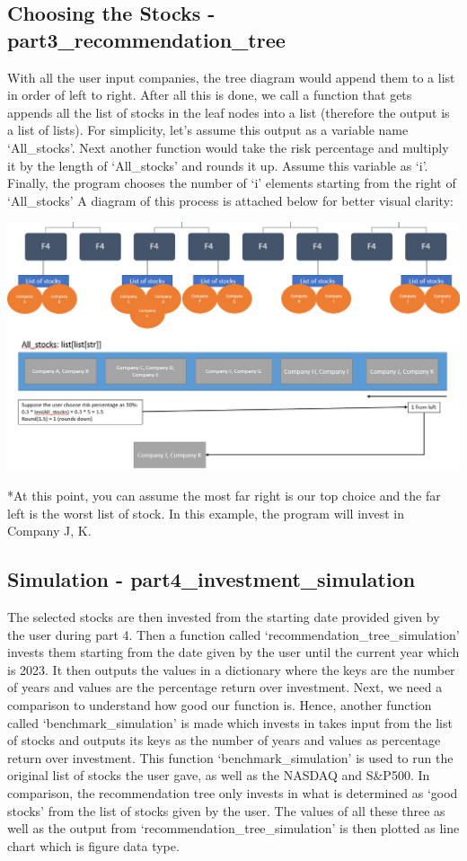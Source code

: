 \documentclass[fontsize=11pt]{article}
\begin{document}
\subsection{Choosing the Stocks - part3\_recommendation\_tree}
With all the user input companies, the tree diagram would append them to a list in order of left to right. After all this is done, we call a function that gets appends all the list of stocks in the leaf nodes into a list (therefore the output is a list of lists). For simplicity, let's assume this output as a variable name `All\_stocks'. Next another function would take the risk percentage and multiply it by the length of `All\_stocks' and rounds it up. Assume this variable as `i'. Finally, the program chooses the number of `i' elements starting from the right of `All\_stocks' A diagram of this process is attached below for better visual clarity:
\begin{center}
\includegraphics[scale=0.65]{choosing_stocks.png}
\end{center}
*At this point, you can assume the most far right is our top choice and the far left is the worst list of stock. In this example, the program will invest in Company J, K.

\subsection{Simulation - part4\_investment\_simulation}
The selected stocks are then invested from the starting date provided given by the user during part 4. Then a function called `recommendation\_tree\_simulation' invests them starting from the date given by the user until the current year which is 2023. It then outputs the values in a dictionary where the keys are the number of years and values are the percentage return over investment. Next, we need a comparison to understand how good our function is. Hence, another function called `benchmark\_simulation' is made which invests in takes input from the list of stocks and outputs its keys as the number of years and values as percentage return over investment. 
This function `benchmark\_simulation' is used to run the original list of stocks the user gave, as well as the NASDAQ and S\&P500. In comparison, the recommendation tree only invests in what is determined as `good stocks' from the list of stocks given by the user. The values of all these three as well as the output from `recommendation\_tree\_simulation' is then plotted as line chart which is figure data type.
\end{document}
